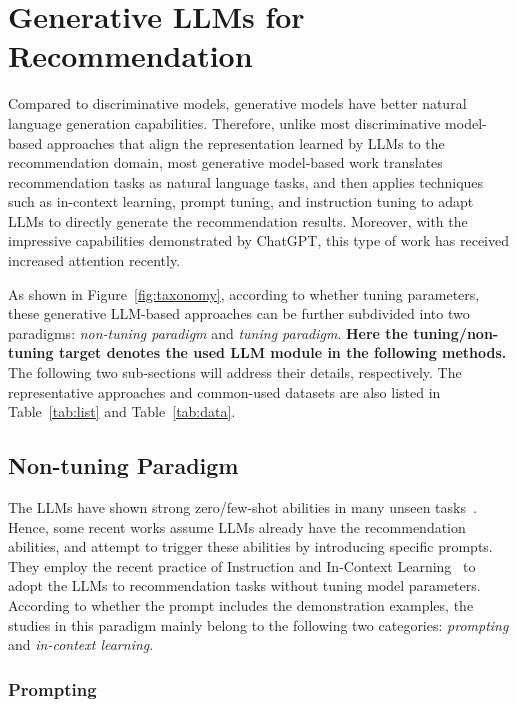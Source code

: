 \documentclass[sn-mathphys-num]{sn-jnl}%
\theoremstyle{thmstyleone}%
\theoremstyle{thmstyletwo}%
\theoremstyle{thmstylethree}%
\begin{document}
\section{Generative LLMs for Recommendation}
Compared to discriminative models, generative models have better natural language generation capabilities.
Therefore, unlike most discriminative model-based approaches that align the representation learned by LLMs to the recommendation domain, most generative model-based work translates recommendation tasks as natural language tasks, and then applies techniques such as in-context learning, prompt tuning, and instruction tuning to adapt LLMs to directly generate the recommendation results.
Moreover, with the impressive capabilities demonstrated by ChatGPT, this type of work has received increased attention recently.

As shown in Figure~\ref{fig:taxonomy}, according to whether tuning parameters, these generative LLM-based approaches can be further subdivided into two paradigms: \textit{non-tuning paradigm} and \textit{tuning paradigm}. \textbf{Here the tuning/non-tuning target denotes the used LLM module in the following methods.}
The following two sub-sections will address their details, respectively. The representative approaches and common-used datasets are also listed in Table~\ref{tab:list} and Table~\ref{tab:data}.

\subsection{Non-tuning Paradigm}
The LLMs have shown strong zero/few-shot abilities in many unseen tasks~\cite{GPT3,InstructGPT}. Hence, some recent works assume LLMs already have the recommendation abilities, and attempt to trigger these abilities by introducing specific prompts. 
They employ the recent practice of Instruction and In-Context Learning~\cite{GPT3} to adopt the LLMs to recommendation tasks without tuning model parameters. 
According to whether the prompt includes the demonstration examples, the studies in this paradigm mainly belong to the following two categories: \textit{prompting} and \textit{in-context learning}. 
\subsubsection{Prompting}
\end{document}
